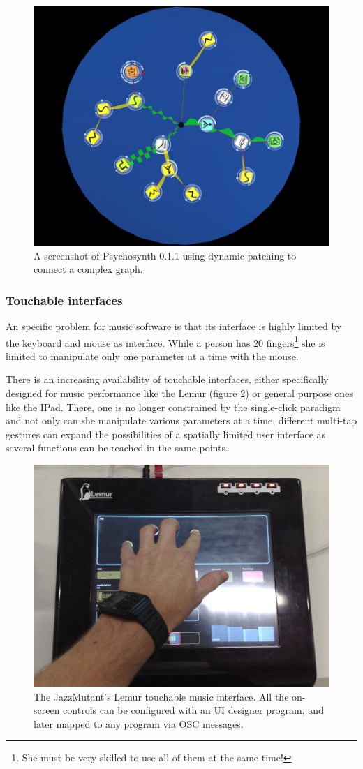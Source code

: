 \begin{figure}[h!]
\centering
\includegraphics[width=.6\textwidth]{pic/dynamic-patch.png}
\caption{A screenshot of Psychosynth 0.1.1 using dynamic patching to
  connect a complex graph.}
\label{fig:dynamicpatch}
\end{figure}

\subsubsection{Touchable interfaces}

An specific problem for music software is that its interface is highly
limited by the keyboard and mouse as interface. While a person has 20
fingers\footnote{She must be very skilled to use all of them at the
  same time!} she is limited to manipulate only one parameter at a time
with the mouse.

There is an increasing availability of touchable interfaces, either
specifically designed for music performance like the Lemur (figure
\ref{fig:lemur}) or general purpose ones like the IPad. There, one is
no longer constrained by the single-click paradigm and not only can
she manipulate various parameters at a time, different multi-tap
gestures can expand the possibilities of a spatially limited user
interface as several functions can be reached in the same points.

\begin{figure}[h!]
\centering
\includegraphics[width=.6\textwidth]{pic/lemur.jpg}
\caption[The JazzMutant's Lemur touchable music interface.]{The
  JazzMutant's Lemur touchable music interface. All the on-screen
  controls can be configured with an UI designer program, and later
  mapped to any program via OSC messages.}
\label{fig:lemur}
\end{figure}

